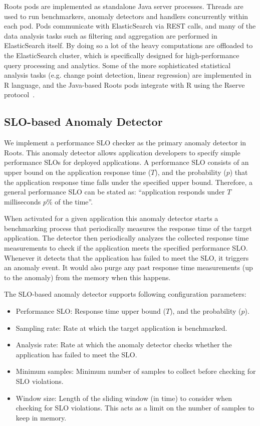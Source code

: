 Roots pods are implemented as standalone Java server processes. Threads are used to run benchmarkers,
anomaly detectors and handlers concurrently within each pod. Pods communicate with ElasticSearch via
REST calls, and many of the data analysis tasks such as filtering and aggregation are performed
in ElasticSearch itself. By doing so a lot of the heavy computations are offloaded to the 
ElasticSearch cluster, which is specifically designed for high-performance query processing
and analytics. Some of the more sophisticated statistical analysis tasks (e.g. change point detection, 
linear regression) are implemented in R language,
and the Java-based Roots pods integrate with R using the Rserve protocol~\cite{Urbanek03rserve--}.

\subsection{SLO-based Anomaly Detector}
We implement a performance SLO checker as the primary anomaly detector in Roots. This anomaly detector
allows application developers to specify simple performance SLOs for deployed applications. A
performance SLO consists of an upper bound on the application response time ($T$), and the probability ($p$)
that the application response time falls under the specified upper bound. Therefore, a general performance 
SLO can be stated as: ``application responds under $T$ milliseconds $p$\% of the time''.

When activated for a given application this anomaly detector starts a benchmarking process
that periodically measures the response time of the target application. The detector then periodically
analyzes the collected response time measurements to check if the application meets the specified performance
SLO. Whenever it detects that the application has failed to meet the SLO, it triggers an anomaly event. It would also
purge any past response time measurements (up to the anomaly) from the memory 
when this happens.

The SLO-based anomaly detector supports following configuration parameters:
\begin{itemize}
\item Performance SLO: Response time upper bound ($T$), and the probability ($p$).
\item Sampling rate: Rate at which the target application is benchmarked.
\item Analysis rate: Rate at which the anomaly detector checks whether the application has failed to meet the SLO.
\item Minimum samples: Minimum number of samples to collect before checking for SLO violations.
\item Window size: Length of the sliding window (in time) to consider when checking for SLO violations. This
acts as a limit on the number of samples to keep in memory.
\end{itemize}


